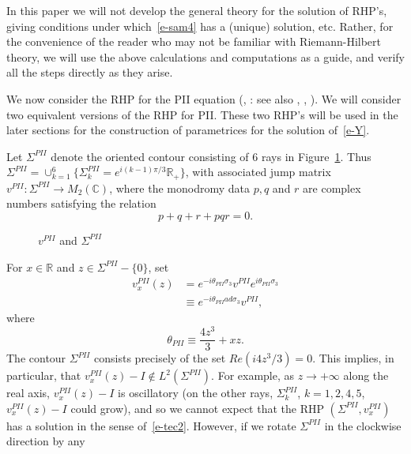 \documentclass{amsart}
\theoremstyle{definition}
\theoremstyle{remark}
\numberwithin{equation}{section}
\newcommand{\C}{\mathbb C}
\newcommand{\R}{\mathbb R}
\begin{document}
In this paper we will not develop the general theory for the solution 
of RHP's, giving conditions under which~\eqref{e-sam4} has a (unique) 
solution, etc. 
Rather, for the convenience of the reader who may not be familiar with 
Riemann-Hilbert theory, we will use the above calculations 
and computations as a guide, 
and verify all the steps directly as they arise.






\bigskip
We now consider the RHP for the PII equation 
(\cite{FN}, \cite{JMU} : see also \cite{IN}, \cite{FZ}, \cite{DZ}).
We will consider two equivalent versions of the RHP for PII.
These two RHP's  
will be used in the later sections for the construction of parametrices 
for the solution of~\eqref{e-Y}.

Let $\Sigma^{PII}$ denote the oriented contour consisting of 6 rays 
in Figure~\ref{fig-PII}.
Thus $\Sigma^{PII}=\cup_{k=1}^{6}\{ \Sigma^{PII}_{k}=e^{i(k-1)\pi/3} \R_+ \}$,
with associated jump matrix $v^{PII} : \Sigma^{PII} \to M_2(\C)$, 
where the monodromy data $p,q$ and $r$ are 
complex numbers satisfying the relation
\begin{equation}\label{e-mon}
  p+q+r+pqr=0.
\end{equation}
\begin{figure}[ht]
 \centerline{}
 \caption{$v^{PII}$ and $\Sigma^{PII}$}\label{fig-PII}
\end{figure}
For $x\in\R$ and $z\in\Sigma^{PII}-\{0\}$, set
\begin{equation}
  \begin{split}
     v_x^{PII}(z)&=e^{-i\theta_{PII}\sigma_3}v^{PII}
e^{i\theta_{PII}\sigma_3}\\
     &\equiv e^{-i\theta_{PII}ad\sigma_3}v^{PII}, 
  \end{split}
\end{equation}
where
\begin{equation}
    \theta_{PII}\equiv \frac{4z^3}3+xz.
\end{equation}
The contour $\Sigma^{PII}$ consists precisely of the set $Re(i4z^3/3)=0$.
This implies, in particular, that $v_x^{PII}(z)-I \notin L^2(\Sigma^{PII})$.
For example, as $z\to +\infty$ along the real axis, 
$v_x^{PII}(z)-I$ is oscillatory 
(on the other rays, $\Sigma^{PII}_{k}$, $k=1,2,4,5$, $v_x^{PII}(z)-I$ 
could grow), and so we cannot expect that the RHP 
$(\Sigma^{PII},v_x^{PII})$ has a solution in the sense of~\eqref{e-tec2}.
However, if we rotate $\Sigma^{PII}$ in the clockwise direction by any  
\end{document}
